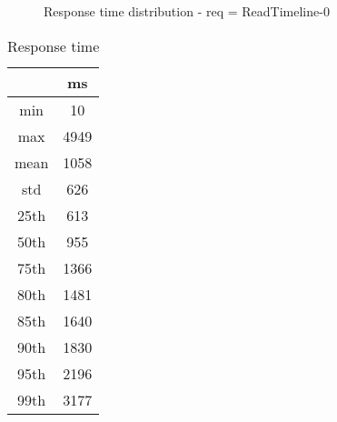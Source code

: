 \begin{minipage}{0.75\linewidth}
\begin{figure}[h]
\begin{adjustbox}{max width=1.0\linewidth, keepaspectratio}
  \end{adjustbox}
  \caption{Response time distribution - req = ReadTimeline-0}
\end{figure}
\end{minipage}\hfill\begin{minipage}{0.18\linewidth}
\begin{table}[h]
\begin{tabular}{|cc|}
\hline
\textbf{} & \textbf{ms}\\ \hline
 \Xhline{0.005\arrayrulewidth}
min & 10\\
 \Xhline{0.005\arrayrulewidth}
max & 4949\\
 \Xhline{0.005\arrayrulewidth}
mean & 1058\\
 \Xhline{0.005\arrayrulewidth}
std & 626\\
\hline
\hline
 \Xhline{0.005\arrayrulewidth}
25th & 613\\
 \Xhline{0.005\arrayrulewidth}
50th & 955\\
 \Xhline{0.005\arrayrulewidth}
75th & 1366\\
 \Xhline{0.005\arrayrulewidth}
80th & 1481\\
 \Xhline{0.005\arrayrulewidth}
85th & 1640\\
 \Xhline{0.005\arrayrulewidth}
90th & 1830\\
 \Xhline{0.005\arrayrulewidth}
95th & 2196\\
 \Xhline{0.005\arrayrulewidth}
99th & 3177\\
\hline
\end{tabular}
\caption{Response time}
\end{table}
\end{minipage}\hfill